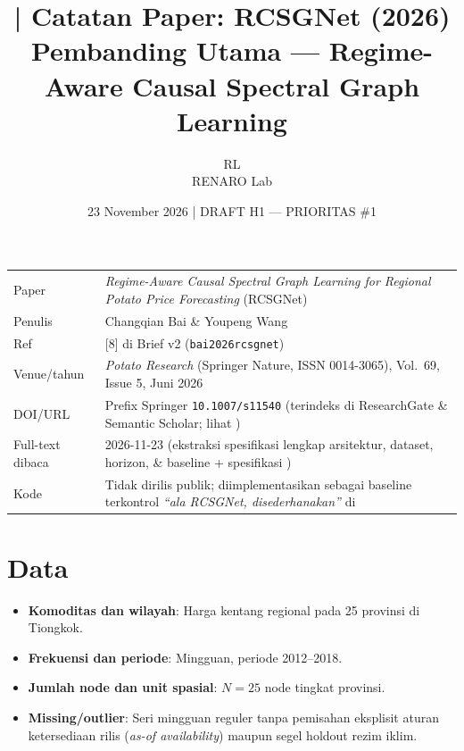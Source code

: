 \documentclass[11pt,a4paper]{article}
\title{\jobid{RL-H1-02} | Catatan Paper: RCSGNet (2026)\\
\large Pembanding Utama --- Regime-Aware Causal Spectral Graph Learning}
\author{RL \\ \small RENARO Lab}
\date{23 November 2026 \quad | \quad \textcolor{blue!65!black}{DRAFT H1 --- PRIORITAS \#1}}
\begin{document}
\maketitle

\begin{table}[H]
\centering
\small
\begin{tabular}{@{}L{3.4cm}L{11.2cm}@{}}
\toprule
Paper & \emph{Regime-Aware Causal Spectral Graph Learning for Regional Potato Price Forecasting} (RCSGNet) \\
Penulis & Changqian Bai \& Youpeng Wang \\
Ref & [8] di Brief v2 (\texttt{bai2026rcsgnet}) \\
Venue/tahun & \emph{Potato Research} (Springer Nature, ISSN 0014-3065), Vol.\ 69, Issue 5, Juni 2026 \\
DOI/URL & Prefix Springer \texttt{10.1007/s11540} (terindeks di ResearchGate \& Semantic Scholar; lihat ) \\
Full-text dibaca & 2026-11-23 (ekstraksi spesifikasi lengkap arsitektur, dataset, horizon, \& baseline + spesifikasi ) \\
Kode & Tidak dirilis publik; diimplementasikan sebagai baseline terkontrol \emph{``ala RCSGNet, disederhanakan''} di  \\
\bottomrule
\end{tabular}
\end{table}

\section{Data}
\begin{itemize}
  \item \textbf{Komoditas dan wilayah}: Harga kentang regional pada 25 provinsi di Tiongkok.
  \item \textbf{Frekuensi dan periode}: Mingguan, periode 2012--2018.
  \item \textbf{Jumlah node dan unit spasial}: $N = 25$ node tingkat provinsi.
  \item \textbf{Missing/outlier}: Seri mingguan reguler tanpa pemisahan eksplisit aturan ketersediaan rilis (\emph{as-of availability}) maupun segel holdout rezim iklim.
\end{itemize}
\end{document}
